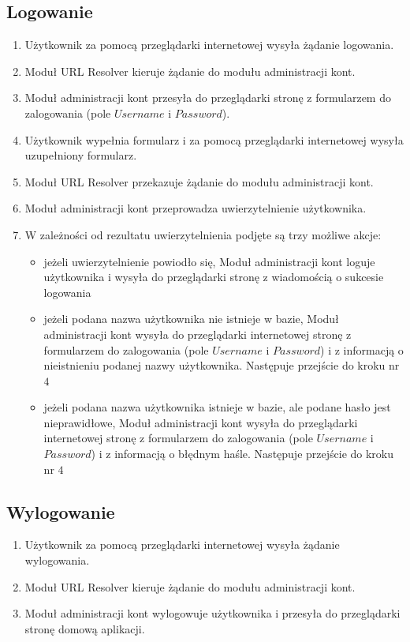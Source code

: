 \documentclass[pdflatex,11pt]{../aghdoc_version2}
\begin{document}
\subsection{Logowanie}
\begin{enumerate}
\item Użytkownik za pomocą przeglądarki internetowej wysyła żądanie logowania.
\item Moduł URL Resolver kieruje żądanie do modułu administracji kont.
\item Moduł administracji kont przesyła do przeglądarki stronę z formularzem do
zalogowania (pole $Username$ i $Password$).
\item Użytkownik wypełnia formularz i za pomocą przeglądarki internetowej wysyła
uzupełniony formularz.
\item Moduł URL Resolver przekazuje żądanie do modułu administracji kont.
\item Moduł administracji kont przeprowadza uwierzytelnienie użytkownika.
\item W zależności od rezultatu uwierzytelnienia podjęte są trzy możliwe akcje:
	\begin{itemize}
	\item jeżeli uwierzytelnienie powiodło się, Moduł administracji kont loguje użytkownika 		i wysyła do
	przeglądarki stronę z wiadomością o sukcesie logowania
	\item jeżeli podana nazwa użytkownika nie istnieje w bazie, Moduł administracji kont 			wysyła do
	przeglądarki internetowej stronę z formularzem do zalogowania (pole
	$Username$ i $Password$) i z informacją o nieistnieniu podanej nazwy
	użytkownika. Następuje przejście do kroku nr $4$
	\item jeżeli podana nazwa użytkownika istnieje w bazie, ale podane hasło jest
nieprawidłowe, Moduł administracji kont wysyła do przeglądarki internetowej stronę z
formularzem do zalogowania (pole $Username$ i $Password$) i z informacją o
błędnym haśle. Następuje przejście do kroku nr $4$
	\end{itemize}
\end{enumerate}

\subsection{Wylogowanie}
\begin{enumerate}
\item Użytkownik za pomocą przeglądarki internetowej wysyła żądanie wylogowania.
\item Moduł URL Resolver kieruje żądanie do modułu administracji kont.
\item Moduł administracji kont wylogowuje użytkownika i przesyła do przeglądarki stronę
domową aplikacji.
\end{enumerate}
\end{document}
